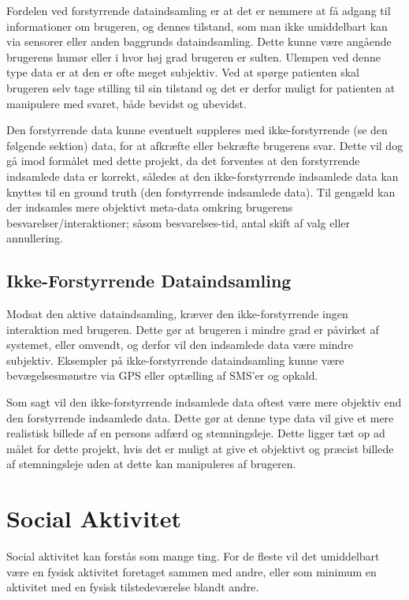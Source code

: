 Fordelen ved forstyrrende dataindsamling er at det er nemmere at få adgang til informationer om brugeren, og dennes tilstand, som man ikke umiddelbart kan via sensorer eller anden baggrunds dataindsamling.
Dette kunne være angående brugerens humør eller i hvor høj grad brugeren er sulten.
Ulempen ved denne type data er at den er ofte meget subjektiv. 
Ved at spørge patienten skal brugeren selv tage stilling til sin tilstand og det er derfor muligt for patienten at manipulere med svaret, både bevidst og ubevidst.

Den forstyrrende data kunne eventuelt suppleres med ikke-forstyrrende (se den følgende sektion) data, for at afkræfte eller bekræfte brugerens svar.
Dette vil dog gå imod formålet med dette projekt, da det forventes at den forstyrrende indsamlede data er korrekt, således at den ikke-forstyrrende indsamlede data kan knyttes til en ground truth (den forstyrrende indsamlede data).
Til gengæld kan der indsamles mere objektivt meta-data omkring brugerens besvarelser/interaktioner; såsom besvarelses-tid, antal skift af valg eller annullering.

\subsection{Ikke-Forstyrrende Dataindsamling}
Modsat den aktive dataindsamling, kræver den ikke-forstyrrende ingen interaktion med brugeren.
Dette gør at brugeren i mindre grad er påvirket af systemet, eller omvendt, og derfor vil den indsamlede data være mindre subjektiv.
Eksempler på ikke-forstyrrende dataindsamling kunne være bevægelsesmønstre via GPS eller optælling af SMS'er og opkald.

Som sagt vil den ikke-forstyrrende indsamlede data oftest være mere objektiv end den forstyrrende indsamlede data.
Dette gør at denne type data vil give et mere realistisk billede af en persons adfærd og stemningsleje.
Dette ligger tæt op ad målet for dette projekt, hvis det er muligt at give et objektivt og præcist billede af stemningsleje uden at dette kan manipuleres af brugeren.

\section{Social Aktivitet}
Social aktivitet kan forstås som mange ting.
For de fleste vil det umiddelbart være en fysisk aktivitet foretaget sammen med andre, eller som minimum en aktivitet med en fysisk tilstedeværelse blandt andre.

